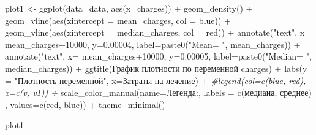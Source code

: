 \documentclass[
]{article}
\newenvironment{Shaded}{\begin{snugshade}}{\end{snugshade}}
\newcommand{\AttributeTok}[1]{\textcolor[rgb]{0.77,0.63,0.00}{#1}}
\newcommand{\CommentTok}[1]{\textcolor[rgb]{0.56,0.35,0.01}{\textit{#1}}}
\newcommand{\DecValTok}[1]{\textcolor[rgb]{0.00,0.00,0.81}{#1}}
\newcommand{\FloatTok}[1]{\textcolor[rgb]{0.00,0.00,0.81}{#1}}
\newcommand{\FunctionTok}[1]{\textcolor[rgb]{0.00,0.00,0.00}{#1}}
\newcommand{\NormalTok}[1]{#1}
\newcommand{\OtherTok}[1]{\textcolor[rgb]{0.56,0.35,0.01}{#1}}
\newcommand{\SpecialCharTok}[1]{\textcolor[rgb]{0.00,0.00,0.00}{#1}}
\newcommand{\StringTok}[1]{\textcolor[rgb]{0.31,0.60,0.02}{#1}}
\begin{document}
\begin{Shaded}
\begin{Highlighting}[]
\NormalTok{plot1 }\OtherTok{\textless{}{-}} \FunctionTok{ggplot}\NormalTok{(}\AttributeTok{data=}\NormalTok{data, }\FunctionTok{aes}\NormalTok{(}\AttributeTok{x=}\NormalTok{charges)) }\SpecialCharTok{+}
  \FunctionTok{geom\_density}\NormalTok{() }\SpecialCharTok{+}
  \FunctionTok{geom\_vline}\NormalTok{(}\FunctionTok{aes}\NormalTok{(}\AttributeTok{xintercept =}\NormalTok{ mean\_charges, }\AttributeTok{col =} \StringTok{\textquotesingle{}blue\textquotesingle{}}\NormalTok{)) }\SpecialCharTok{+}
  \FunctionTok{geom\_vline}\NormalTok{(}\FunctionTok{aes}\NormalTok{(}\AttributeTok{xintercept =}\NormalTok{ median\_charges, }\AttributeTok{col =} \StringTok{\textquotesingle{}red\textquotesingle{}}\NormalTok{)) }\SpecialCharTok{+}
  \FunctionTok{annotate}\NormalTok{(}\StringTok{"text"}\NormalTok{, }
           \AttributeTok{x=}\NormalTok{ mean\_charges}\SpecialCharTok{+}\DecValTok{10000}\NormalTok{,}
           \AttributeTok{y=}\FloatTok{0.00004}\NormalTok{, }
           \AttributeTok{label=}\FunctionTok{paste0}\NormalTok{(}\StringTok{"Mean= "}\NormalTok{, mean\_charges)) }\SpecialCharTok{+}
  \FunctionTok{annotate}\NormalTok{(}\StringTok{"text"}\NormalTok{,}
           \AttributeTok{x=}\NormalTok{ mean\_charges}\SpecialCharTok{+}\DecValTok{10000}\NormalTok{,}
           \AttributeTok{y=}\FloatTok{0.00005}\NormalTok{, }
           \AttributeTok{label=}\FunctionTok{paste0}\NormalTok{(}\StringTok{"Median= "}\NormalTok{, median\_charges)) }\SpecialCharTok{+}
  \FunctionTok{ggtitle}\NormalTok{(}\StringTok{\textquotesingle{}График плотности по переменной charges\textquotesingle{}}\NormalTok{) }\SpecialCharTok{+}
  \FunctionTok{labs}\NormalTok{(}\AttributeTok{y =} \StringTok{"Плотность переменной"}\NormalTok{, }\AttributeTok{x=}\StringTok{\textquotesingle{}Затраты на лечение\textquotesingle{}}\NormalTok{) }\SpecialCharTok{+}
  \CommentTok{\#legend(col=c(\textquotesingle{}blue\textquotesingle{}, \textquotesingle{}red\textquotesingle{}), x=c(\textquotesingle{}v\textquotesingle{}, \textquotesingle{}v1\textquotesingle{})) +}
  \FunctionTok{scale\_color\_manual}\NormalTok{(}\AttributeTok{name=}\StringTok{\textquotesingle{}Легенда:\textquotesingle{}}\NormalTok{, }\AttributeTok{labels =} \FunctionTok{c}\NormalTok{(}\StringTok{\textquotesingle{}медиана\textquotesingle{}}\NormalTok{, }\StringTok{\textquotesingle{}среднее\textquotesingle{}}\NormalTok{) , }\AttributeTok{values=}\FunctionTok{c}\NormalTok{(}\StringTok{\textquotesingle{}red\textquotesingle{}}\NormalTok{, }\StringTok{\textquotesingle{}blue\textquotesingle{}}\NormalTok{)) }\SpecialCharTok{+}
  \FunctionTok{theme\_minimal}\NormalTok{()}

\NormalTok{plot1}
\end{Highlighting}
\end{Shaded}
\end{document}
